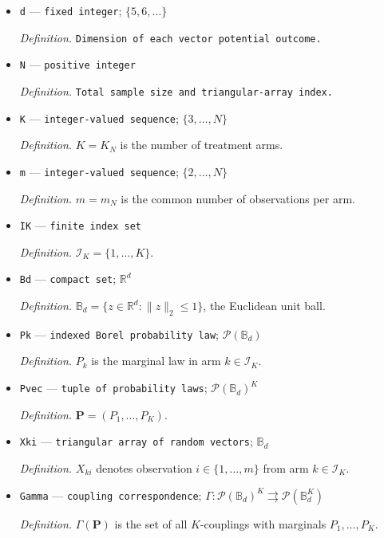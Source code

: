 \documentclass{article}
\begin{document}
\begin{itemize}
  \item \texttt{d} --- \texttt{fixed integer}; \(\{5,6,\ldots\}\)
  \par\smallskip\noindent\emph{Definition.} \texttt{Dimension of each vector potential outcome.}
  \item \texttt{N} --- \texttt{positive integer}
  \par\smallskip\noindent\emph{Definition.} \texttt{Total sample size and triangular-\allowbreak{}array index.}
  \item \texttt{K} --- \texttt{integer-\allowbreak{}valued sequence}; \(\{3,\ldots,N\}\)
  \par\smallskip\noindent\emph{Definition.} \(K=K_N\) is the number of treatment arms.
  \item \texttt{m} --- \texttt{integer-\allowbreak{}valued sequence}; \(\{2,\ldots,N\}\)
  \par\smallskip\noindent\emph{Definition.} \(m=m_N\) is the common number of observations per arm.
  \item \texttt{IK} --- \texttt{finite index set}
  \par\smallskip\noindent\emph{Definition.} \(\mathcal I_K=\{1,\ldots,K\}\).
  \item \texttt{Bd} --- \texttt{compact set}; \(\mathbb R^d\)
  \par\smallskip\noindent\emph{Definition.} \(\mathbb B_d=\{z\in\mathbb R^d:\|z\|_2\le 1\}\), the Euclidean unit ball.
  \item \texttt{Pk} --- \texttt{indexed Borel probability law}; \(\mathcal P(\mathbb B_d)\)
  \par\smallskip\noindent\emph{Definition.} \(P_k\) is the marginal law in arm \(k\in\mathcal I_K\).
  \item \texttt{Pvec} --- \texttt{tuple of probability laws}; \(\mathcal P(\mathbb B_d)^K\)
  \par\smallskip\noindent\emph{Definition.} \(\mathbf P=(P_1,\ldots,P_K)\).
  \item \texttt{Xki} --- \texttt{triangular array of random vectors}; \(\mathbb B_d\)
  \par\smallskip\noindent\emph{Definition.} \(X_{ki}\) denotes observation \(i\in\{1,\ldots,m\}\) from arm \(k\in\mathcal I_K\).
  \item \texttt{Gamma} --- \texttt{coupling correspondence}; \(\Gamma:\mathcal P(\mathbb B_d)^K\rightrightarrows\mathcal P(\mathbb B_d^K)\)
  \par\smallskip\noindent\emph{Definition.} \(\Gamma(\mathbf P)\) is the set of all \(K\)-couplings with marginals \(P_1,\ldots,P_K\).

\end{itemize}
\end{document}

